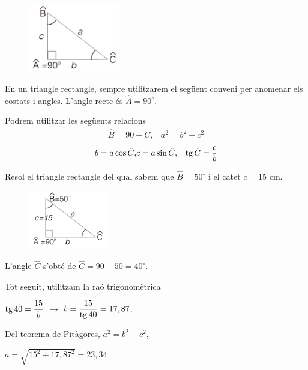 \begin{theorybox}
	\begin{figure}
		\includegraphics[width=4cm]{img-03/triangle-rectangle1}
	\end{figure}
	En un triangle rectangle, sempre utilitzarem el següent conveni per anomenar els costats i angles. L'angle recte és $\hat A=90^\circ$.
	
	Podrem utilitzar les següents relacions
	\begin{eqnarray*}
		\hat B=90-C, & a^2 = b^2 + c^2
	\end{eqnarray*}
	\begin{eqnarray*}
		b=a \cos \hat C, & c=a \sin \hat C, & \mathrm{tg}\, \hat C= \dfrac{c}{b}
	\end{eqnarray*}	
\end{theorybox}

\begin{resolt}[E]{Resol el triangle rectangle del qual sabem que \linebreak $\hat B=50^\circ$ i el catet $c=15$ cm.}
	
	\begin{figure}
		\vspace{-0.3cm}
		\includegraphics[width=3.5cm]{img-03/triangle-rectangle2}
	\end{figure}
	L'angle $\hat C$ s'obté de $\hat C=90-50 = 40^\circ$.
	
	Tot seguit, utilitzam la raó trigonomètrica \vspace{0.25cm}
	
	$\mathrm{tg}\, 40 = \dfrac{15}{b}$  $\rightarrow$ $b=\dfrac{15}{\mathrm{tg}\, 40}=17,87$.
	
	Del teorema de Pitàgores, $a^2 = b^2 +c^2$, \vspace{0.25cm}
	
	$a=\sqrt{15^2+17,87^2}=23,34$
	
\end{resolt}


